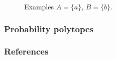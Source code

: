 \begin{frame}
\begin{figure}[ht]
\begin{center}
\begin{tabular}{cc}
        
              
          \end{tabular}
        \end{center}
        \caption{Examples $A = \{a\}$, $B = \{ b\}$.}
      \end{figure}

\end{frame}

\begin{frame}
\frametitle{Probability polytopes}
\end{frame}

\begin{frame}[allowframebreaks]
    \frametitle{References}
    
    
\end{frame}

